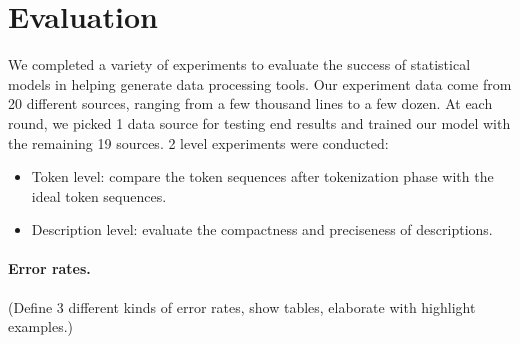 \section{Evaluation}\label{sec:eval}

We completed a variety of experiments to evaluate the success of
statistical models in helping \learnpads{} generate data processing
tools. Our experiment data come from 20 different sources, ranging
from a few thousand lines to a few dozen. At each round, we picked 1
data source for testing end results and trained our model with the
remaining 19 sources. 2 level experiments were conducted:

\begin{itemize}
\item Token level: compare the token sequences after tokenization
phase with the ideal token sequences.
\item Description level: evaluate the compactness and preciseness
of descriptions.
\end{itemize}

\paragraph*{Error rates.}

(Define 3 different kinds of error rates, show tables, elaborate with
highlight examples.)

